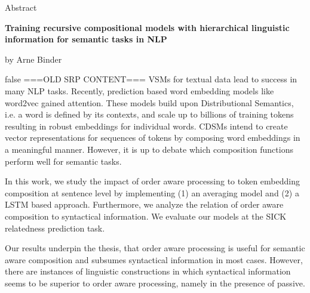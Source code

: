 
\begin{center}
	\huge{Abstract} 
	\vspace{0.5cm}
	 
	\large{\bf{Training recursive compositional models with hierarchical linguistic information for semantic tasks in NLP}} 
	\vspace{0.5cm}

	by Arne Binder \\
\end{center}

\vspace{0.5cm}
\normalsize


\if false
===OLD SRP CONTENT===
\acfp{VSM} for textual data lead to success in many \ac{NLP} tasks. Recently, prediction based word embedding models like word2vec %
gained attention. These models build upon Distributional Semantics, i.e. a word is defined by its contexts, and scale up to billions of training tokens %
resulting in robust embeddings for individual words. 
\acfp{CDSM} intend to create vector representations for sequences of tokens by composing word embeddings in a meaningful manner. However, it is up to debate which composition functions perform well for semantic tasks.

In this work, we study the impact of order aware processing to token embedding composition at sentence level by implementing (1) an averaging model and (2) a \ac{LSTM} based approach. Furthermore, we analyze the relation of order aware composition to syntactical information. We evaluate our models at the SICK relatedness prediction task.%

Our results underpin the thesis, that order aware processing is useful for semantic aware composition and subsumes syntactical information in most cases. However, there are instances of linguistic constructions in which syntactical information seems to be superior to order aware processing, namely in the presence of passive.
\fi
